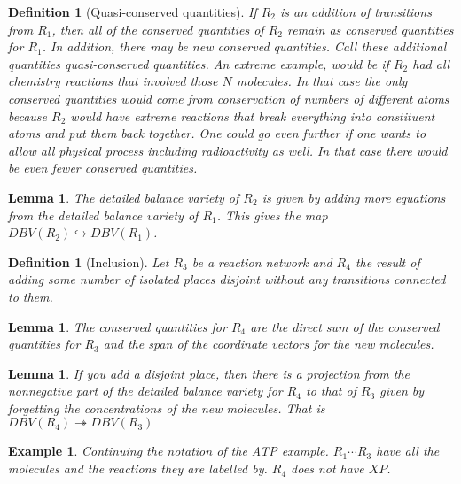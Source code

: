 \documentclass[11pt]{book}
\theoremstyle{change}
\newtheorem{definition}[equation]{Definition}
\newtheorem{lemma}[equation]{Lemma}
\newtheorem{example}[equation]{Example}
\theoremstyle{nonumberplain}
\numberwithin{equation}{section}
\begin{document}
\begin{definition}[Quasi-conserved quantities]
If $R_2$ is an addition of transitions from $R_1$, then all of the conserved quantities of $R_2$ remain as conserved quantities for $R_1$. In addition, there may be new conserved quantities. Call these additional quantities quasi-conserved quantities. An extreme example, would be if $R_2$ had all chemistry reactions that involved those $N$ molecules. In that case the only conserved quantities would come from conservation of numbers of different atoms because $R_2$ would have extreme reactions that break everything into constituent atoms and put them back together. One could go even further if one wants to allow all physical process including radioactivity as well. In that case there would be even fewer conserved quantities.
\end{definition}

\begin{lemma}
The detailed balance variety of $R_2$ is given by adding more equations from the detailed balance variety of $R_1$. This gives the map $DBV(R_2) \hookrightarrow DBV(R_1)$.
\end{lemma}

\begin{definition}[Inclusion]
Let $R_3$ be a reaction network and $R_4$ the result of adding some number of isolated places disjoint without any transitions connected to them.
\end{definition}

\begin{lemma}
The conserved quantities for $R_4$ are the direct sum of the conserved quantities for $R_3$ and the span of the coordinate vectors for the new molecules.
\end{lemma}

\begin{lemma}
If you add a disjoint place, then there is a projection from the nonnegative part of the detailed balance variety for $R_4$ to that of $R_3$ given by forgetting the concentrations of the new molecules. That is $DBV(R_4) \twoheadrightarrow DBV(R_3)$
\end{lemma}

\begin{example}

Continuing the notation of the ATP example. $R_1 \cdots R_3$ have all the molecules and the reactions they are labelled by. $R_4$ does not have $XP$.

\end{example}
\end{document}
